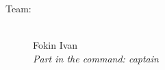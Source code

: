 \large Team:


\begin{figure}[H]
	\begin{minipage}[h]{0.47\linewidth}
		\\
		Fokin Ivan\\
		\emph{Part in the command: captain} 
	\end{minipage}
	\hfill
	\begin{minipage}[h]{0.47\linewidth}

\end{minipage}
\end{figure}
